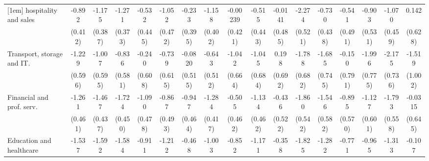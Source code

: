 {\begin{tabular}{l*{16}{c}}
[1em]
hospitality and sales&      -0.892\sym{*}  &      -1.175\sym{**} &      -1.271\sym{***}&      -0.532         &      -1.052\sym{*}  &      -0.233         &      -1.158\sym{**} &    -0.00239         &      -0.515         &     -0.0141         &      -2.274\sym{***}&      -0.730         &      -0.541         &      -0.903         &      -1.070\sym{*}  &       0.142         \\
                    &     (0.412)         &     (0.387)         &     (0.373)         &     (0.445)         &     (0.472)         &     (0.395)         &     (0.402)         &     (0.421)         &     (0.443)         &     (0.485)         &     (0.521)         &     (0.438)         &     (0.491)         &     (0.531)         &     (0.459)         &     (0.628)         \\
[1em]
Transport, storage and IT.&      -1.229\sym{*}  &      -1.007         &      -0.836         &      -0.240         &      -0.739         &     -0.0820         &      -0.643         &      -1.042         &      -1.045         &       0.198         &      -1.788\sym{**} &      -1.685\sym{*}  &      -0.150         &      -1.996\sym{*}  &      -2.175\sym{**} &      -1.519         \\
                    &     (0.596)         &     (0.595)         &     (0.581)         &     (0.608)         &     (0.615)         &     (0.515)         &     (0.512)         &     (0.664)         &     (0.684)         &     (0.692)         &     (0.682)         &     (0.745)         &     (0.791)         &     (0.775)         &     (0.736)         &     (1.002)         \\
[1em]
Financial and prof. serv.&      -1.261\sym{**} &      -1.467\sym{***}&      -1.724\sym{***}&      -1.090\sym{*}  &      -0.867         &      -0.947\sym{*}  &      -1.284\sym{**} &      -0.505         &      -1.134\sym{*}  &      -0.436         &      -1.860\sym{***}&      -1.546\sym{**} &      -0.895         &      -1.127         &      -1.793\sym{**} &     -0.0315         \\
                    &     (0.461)         &     (0.437)         &     (0.450)         &     (0.478)         &     (0.493)         &     (0.464)         &     (0.417)         &     (0.462)         &     (0.462)         &     (0.522)         &     (0.542)         &     (0.582)         &     (0.570)         &     (0.601)         &     (0.558)         &     (0.645)         \\
[1em]
Education and healthcare&      -1.537\sym{***}&      -1.592\sym{***}&      -1.584\sym{***}&      -0.911\sym{*}  &      -1.212\sym{*}  &      -0.468         &      -1.003\sym{*}  &      -0.852         &      -1.171\sym{*}  &      -0.358         &      -1.825\sym{***}&      -1.282\sym{*}  &      -0.771         &      -0.965         &      -1.313\sym{*}  &      -0.107         \\

\end{tabular}}
